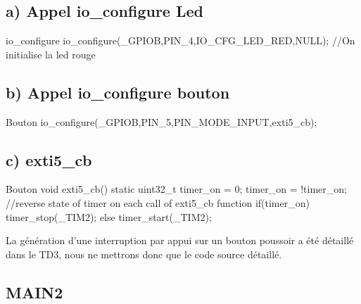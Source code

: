 \subsection{a) Appel io\_configure Led}

\begin{Cpp}{io\_configure} 
io_configure(_GPIOB,PIN_4,IO_CFG_LED_RED,NULL); //On initialise la led rouge
\end{Cpp}

\subsection{b) Appel io\_configure bouton}

\begin{Cpp}{ Bouton} 
io_configure(_GPIOB,PIN_5,PIN_MODE_INPUT,exti5_cb);
\end{Cpp}

\subsection{c) exti5\_cb}

\begin{Cpp}{ Bouton} 
void exti5_cb()
{
    static uint32_t timer_on = 0;
    timer_on = !timer_on;  //reverse state of timer on each call of exti5_cb function
    if(timer_on)
    {
        timer_stop(_TIM2); 
    }
    else
    {
        timer_start(_TIM2);
    }
}
\end{Cpp}

La génération d'une interruption par appui sur un bouton poussoir a été détaillé dans le TD3, nous ne mettrons donc que le code source détaillé.

\newpage
\subsection{MAIN2}

